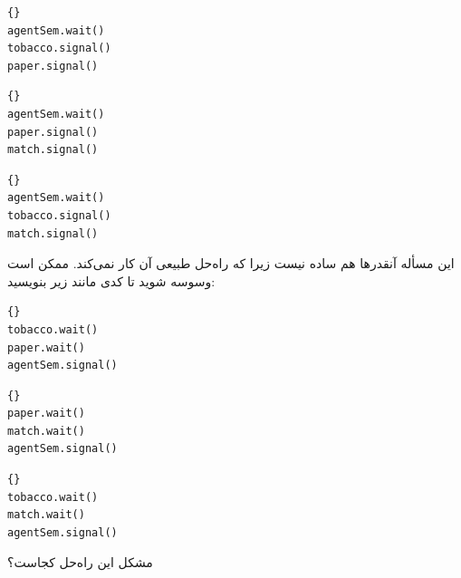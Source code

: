 \documentclass{book}
\begin{document}
\begin{latin}
\begin{lstlisting}[title=\rl{کد عامل \lr{A}}]{}
agentSem.wait()
tobacco.signal()
paper.signal()
\end{lstlisting}
\end{latin}


\begin{latin}
\begin{lstlisting}[title=\rl{کد عامل \lr{B}}]{}
agentSem.wait()
paper.signal()
match.signal()
\end{lstlisting}
\end{latin}

\begin{latin}
\begin{lstlisting}[title=\rl{کد عامل \lr{C}}]{}
agentSem.wait()
tobacco.signal()
match.signal()
\end{lstlisting}
\end{latin}

    این مسأله آنقدرها هم ساده نیست زیرا که راه‌حل طبیعی آن کار نمی‌کند.  ممکن است وسوسه شوید تا کدی مانند زیر بنویسید:
    

\begin{latin}
\begin{lstlisting}[title=\rl{‌سیگاری کبریت‌دار}]{}
tobacco.wait()
paper.wait()
agentSem.signal()
\end{lstlisting}
\end{latin}

\begin{latin}
\begin{lstlisting}[title=\rl{سیگاری تنباکو‌دار}]{}
paper.wait()
match.wait()
agentSem.signal()
\end{lstlisting}
\end{latin}

\begin{latin}
\begin{lstlisting}[title=\rl{سیگاری کاغذدار}]{}
tobacco.wait()
match.wait()
agentSem.signal()
\end{lstlisting}
\end{latin}

    مشکل این  راه‌حل کجاست؟
\end{document}
